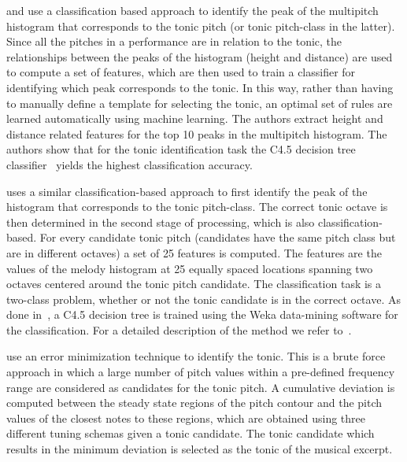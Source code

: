 \cite{salamon2012multipitch} and \cite{gulati2012two} use a classification based approach to identify the peak of the multipitch histogram that corresponds to the tonic pitch (or tonic pitch-class in the latter). Since all the pitches in a performance are in relation to the tonic, the relationships between the peaks of the histogram (height and distance) are used to compute a set of features, which are then used to train a classifier for identifying which peak corresponds to the tonic. In this way, rather than having to manually define a template for selecting the tonic, an optimal set of rules are learned automatically using machine learning. The authors extract height and distance related features for the top 10 peaks in the multipitch histogram. The authors show that for the tonic identification task the C4.5 decision tree classifier~\citep{Quinlan:1993:CPM:152181} yields the highest classification accuracy. 

\cite{gulati2012two} uses a similar classification-based approach to first identify the peak of the histogram that corresponds to the tonic pitch-class. The correct tonic octave is then determined in the second stage of processing, which is also classification-based. For every candidate tonic pitch (candidates have the same pitch class but are in different octaves) a set of 25 features is computed. The features are the values of the melody histogram at 25 equally spaced locations spanning two octaves centered around the tonic pitch candidate. The classification task is a two-class problem, whether or not the tonic candidate is in the correct octave. As done in~\cite{salamon2012multipitch}, a C4.5 decision tree is trained using the Weka data-mining software for the classification. For a detailed description of the method we refer to~\cite{SGulati_MThesis2012}.

\cite{Sengupta2005b} use an error minimization technique to identify the tonic. This is a brute force approach in which a large number of pitch values within a pre-defined frequency range are considered as candidates for the tonic pitch. A cumulative deviation is computed between the steady state regions of the pitch contour and the pitch values of the closest notes to these regions, which are obtained using three different tuning schemas given a tonic candidate. The tonic candidate which results in the minimum deviation is selected as the tonic of the musical excerpt.

